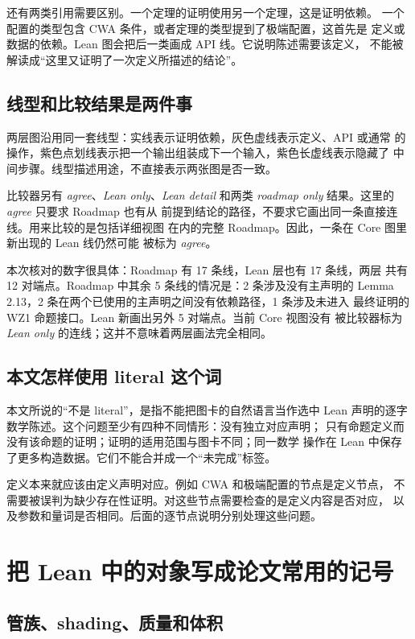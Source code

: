 \documentclass[UTF8,11pt,a4paper,fontset=none]{ctexart}
\begin{document}
还有两类引用需要区别。一个定理的证明使用另一个定理，这是证明依赖。
一个配置的类型包含 CWA 条件，或者定理的类型提到了极端配置，这首先是
定义或数据的依赖。Lean 图会把后一类画成 API 线。它说明陈述需要该定义，
不能被解读成“这里又证明了一次定义所描述的结论”。

\subsection{线型和比较结果是两件事}

两层图沿用同一套线型：实线表示证明依赖，灰色虚线表示定义、API 或通常
的操作，紫色点划线表示把一个输出组装成下一个输入，紫色长虚线表示隐藏了
中间步骤。线型描述用途，不直接表示两张图是否一致。

比较器另有 \emph{agree}、\emph{Lean only}、\emph{Lean detail} 和两类
\emph{roadmap only} 结果。这里的 \emph{agree} 只要求 Roadmap 也有从
前提到结论的路径，不要求它画出同一条直接连线。用来比较的是包括详细视图
在内的完整 Roadmap。因此，一条在 Core 图里新出现的 Lean 线仍然可能
被标为 \emph{agree}。

本次核对的数字很具体：Roadmap 有 17 条线，Lean 层也有 17 条线，两层
共有 12 对端点。Roadmap 中其余 5 条线的情况是：2 条涉及没有主声明的
Lemma 2.13，2 条在两个已使用的主声明之间没有依赖路径，1 条涉及未进入
最终证明的 WZ1 命题接口。Lean 新画出另外 5 对端点。当前 Core 视图没有
被比较器标为 \emph{Lean only} 的连线；这并不意味着两层画法完全相同。

\subsection{本文怎样使用 literal 这个词}

本文所说的“不是 literal”，是指不能把图卡的自然语言当作选中 Lean
声明的逐字数学陈述。这个问题至少有四种不同情形：没有独立对应声明；
只有命题定义而没有该命题的证明；证明的适用范围与图卡不同；同一数学
操作在 Lean 中保存了更多构造数据。它们不能合并成一个“未完成”标签。

定义本来就应该由定义声明对应。例如 CWA 和极端配置的节点是定义节点，
不需要被误判为缺少存在性证明。对这些节点需要检查的是定义内容是否对应，
以及参数和量词是否相同。后面的逐节点说明分别处理这些问题。

\section{把 Lean 中的对象写成论文常用的记号}

\subsection{管族、shading、质量和体积}
\end{document}
